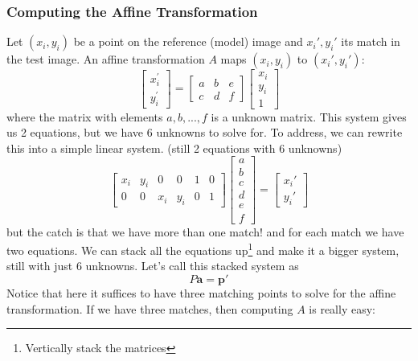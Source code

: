 \documentclass[11pt]{article}
\newcommand{\ba}{\mathbf{a}}
\newcommand{\bp}{\mathbf{p}}
\begin{document}
\subsubsection{Computing the Affine Transformation}
Let $(x_i,y_i)$ be a point on the reference (model) image and $x_i', y_i'$ its match in the test image. An affine transformation $A$ maps $(x_i,y_i)$ to $(x_i',y_i')$:
\begin{equation}
	\left[\begin{array}{l}
		x_{i}^{\prime} \\
		y_{i}^{\prime}
		\end{array}\right]=\left[\begin{array}{lll}
		a & b & e \\
		c & d & f
		\end{array}\right]\left[\begin{array}{l}
		x_{i} \\
		y_{i} \\
		1
	\end{array}\right]
\end{equation}
where the matrix with elements $a, b, ..., f$ is a unknown matrix. This system gives us 2 equations, but we have 6 unknowns to solve for. To address, we can rewrite this into a simple linear system. (still 2 equations with 6 unknowns)
\begin{equation}
	\begin{bmatrix}
		x_i & y_i & 0 & 0 & 1 & 0 \\
		0 & 0 & x_i & y_i & 0 & 1
	\end{bmatrix} \begin{bmatrix}
		a \\ b \\ c \\ d \\ e \\ f 
	\end{bmatrix} = \begin{bmatrix}
		x_i' \\ y_i'
	\end{bmatrix}
\end{equation}
but the catch is that we have more than one match! and for each match we have two equations. We can stack all the equations up\footnote{Vertically stack the matrices} and make it a bigger system, still with just 6 unknowns. Let's call this stacked system as 
\begin{equation}
	P\ba = \bp'
\end{equation}
Notice that here it suffices to have three matching points to solve for the affine transformation. If we have three matches, then computing $A$ is really easy:
\end{document}
